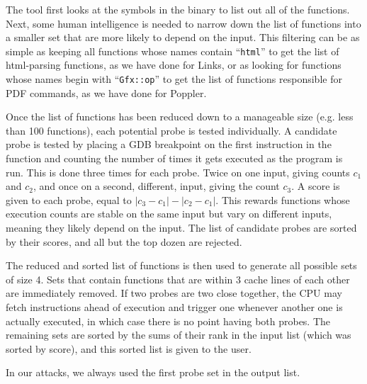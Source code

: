 \documentclass[letterpaper,twocolumn,10pt]{article}
\begin{document}
The tool first looks at the symbols in the binary to list out all of the
functions. Next, some human intelligence is needed to narrow down the list of
functions into a smaller set that are more likely to depend on the input. This
filtering can be as simple as keeping all functions whose names contain
``\texttt{html}'' to get the list of html-parsing functions, as we have done for
Links, or as looking for functions whose names begin with ``\texttt{Gfx::op}''
to get the list of functions responsible for PDF commands, as we have done for
Poppler.

Once the list of functions has been reduced down to a manageable size (e.g. less
than 100 functions), each potential probe is tested individually. A candidate
probe is tested by placing a GDB breakpoint on the first instruction in the
function and counting the number of times it gets executed as the program is
run. This is done three times for each probe. Twice on one input, giving counts
$c_1$ and $c_2$, and once on a second, different, input, giving the count $c_3$.
A score is given to each probe, equal to $|c_3 - c_1| - |c_2 - c_1|$. This
rewards functions whose execution counts are stable on the same input but vary
on different inputs, meaning they likely depend on the input. The list of
candidate probes are sorted by their scores, and all but the top dozen are
rejected.


The reduced and sorted list of functions is then used to generate all possible
sets of size 4. Sets that contain functions that are within 3 cache lines of
each other are immediately removed. If two probes are two close together, the
CPU may fetch instructions ahead of execution and trigger one whenever another
one is actually executed, in which case there is no point having both probes.
The remaining sets are sorted by the sums of their rank in the input list (which
was sorted by score), and this sorted list is given to the user.


In our attacks, we always used the first probe set in the output list.
\end{document}
